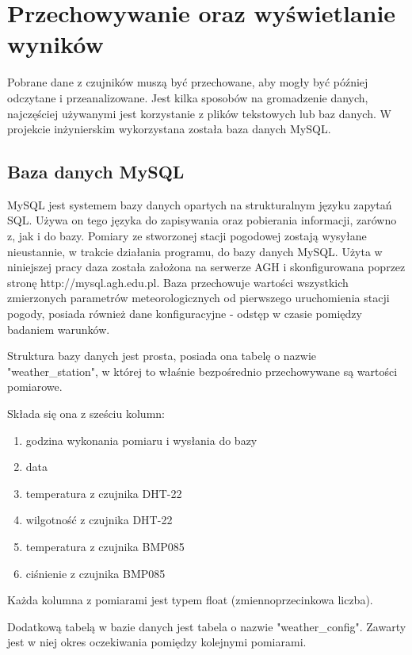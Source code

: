 \chapter{Przechowywanie oraz wyświetlanie wyników}

Pobrane dane z czujników muszą być przechowane, aby mogły być później odczytane i przeanalizowane. Jest kilka sposobów na gromadzenie danych, najczęściej używanymi jest korzystanie z plików tekstowych lub baz danych. W projekcie inżynierskim wykorzystana została baza danych MySQL. 

\section{Baza danych MySQL}
MySQL jest systemem bazy danych opartych na strukturalnym języku zapytań SQL. Używa on tego języka do zapisywania oraz pobierania informacji, zarówno z, jak i do bazy. 
Pomiary ze stworzonej stacji pogodowej zostają wysyłane nieustannie, w trakcie działania programu, do bazy danych MySQL. Użyta w niniejszej pracy daza została założona na serwerze AGH i skonfigurowana poprzez stronę http://mysql.agh.edu.pl. Baza przechowuje wartości wszystkich zmierzonych parametrów meteorologicznych od pierwszego uruchomienia stacji pogody, posiada również dane konfiguracyjne - odstęp w czasie pomiędzy badaniem warunków.

Struktura bazy danych jest prosta, posiada ona tabelę o nazwie "weather\_station", w której to właśnie bezpośrednio przechowywane są wartości pomiarowe.

Składa się ona z sześciu kolumn:
\begin{enumerate}
\setlength{\itemsep}{2pt} 
\setlength{\parskip}{2pt} 
\setlength{\parsep}{2pt}
\item godzina wykonania pomiaru i wysłania do bazy
\item data
\item temperatura z czujnika DHT-22
\item wilgotność z czujnika DHT-22
\item temperatura z czujnika BMP085
\item ciśnienie z czujnika BMP085
\end{enumerate}

Każda kolumna z pomiarami jest typem float (zmiennoprzecinkowa liczba).

Dodatkową tabelą w bazie danych jest tabela o nazwie "weather\_config". Zawarty jest w niej okres oczekiwania pomiędzy kolejnymi pomiarami.

